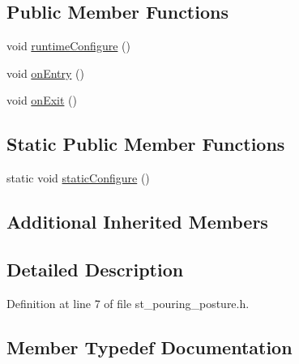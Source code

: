 \subsection*{Public Member Functions}
\begin{DoxyCompactItemize}
\item 
void \hyperlink{structsm__moveit__wine__serve_1_1StPouringPosture_ab07b65aec9bed561342d78752fe79c31}{runtime\+Configure} ()
\item 
void \hyperlink{structsm__moveit__wine__serve_1_1StPouringPosture_acb885a26c8459d0cb624ff1be9c87482}{on\+Entry} ()
\item 
void \hyperlink{structsm__moveit__wine__serve_1_1StPouringPosture_a2c66c9ea54f197e06c3e2e075faeb360}{on\+Exit} ()
\end{DoxyCompactItemize}
\subsection*{Static Public Member Functions}
\begin{DoxyCompactItemize}
\item 
static void \hyperlink{structsm__moveit__wine__serve_1_1StPouringPosture_a3d8119738084a61e5f7d50f4a6ae706c}{static\+Configure} ()
\end{DoxyCompactItemize}
\subsection*{Additional Inherited Members}


\subsection{Detailed Description}


Definition at line 7 of file st\+\_\+pouring\+\_\+posture.\+h.



\subsection{Member Typedef Documentation}
\mbox{\label{structsm__moveit__wine__serve_1_1StPouringPosture_a6ee3787a121256e15cdbdfa5864810fa}} 
